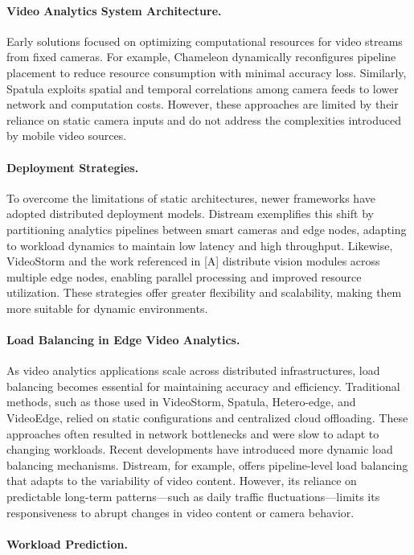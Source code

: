 \paragraph{Video Analytics System Architecture.}
Early solutions focused on optimizing computational resources for video streams from fixed cameras. For example, Chameleon dynamically reconfigures pipeline placement to reduce resource consumption with minimal accuracy loss. Similarly, Spatula exploits spatial and temporal correlations among camera feeds to lower network and computation costs. However, these approaches are limited by their reliance on static camera inputs and do not address the complexities introduced by mobile video sources.

\paragraph{Deployment Strategies.}
To overcome the limitations of static architectures, newer frameworks have adopted distributed deployment models. Distream exemplifies this shift by partitioning analytics pipelines between smart cameras and edge nodes, adapting to workload dynamics to maintain low latency and high throughput. Likewise, VideoStorm and the work referenced in [A] distribute vision modules across multiple edge nodes, enabling parallel processing and improved resource utilization. These strategies offer greater flexibility and scalability, making them more suitable for dynamic environments.

\paragraph{Load Balancing in Edge Video Analytics.}
As video analytics applications scale across distributed infrastructures, load balancing becomes essential for maintaining accuracy and efficiency. Traditional methods, such as those used in VideoStorm, Spatula, Hetero-edge, and VideoEdge, relied on static configurations and centralized cloud offloading. These approaches often resulted in network bottlenecks and were slow to adapt to changing workloads.
Recent developments have introduced more dynamic load balancing mechanisms. Distream, for example, offers pipeline-level load balancing that adapts to the variability of video content. However, its reliance on predictable long-term patterns—such as daily traffic fluctuations—limits its responsiveness to abrupt changes in video content or camera behavior.

\paragraph{Workload Prediction.}

